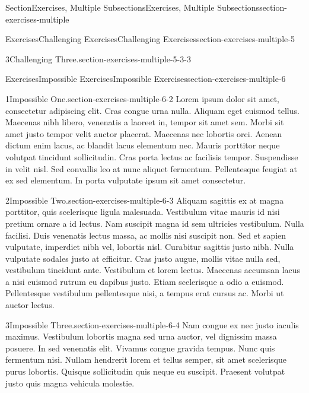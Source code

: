 \documentclass[twoside,10pt,]{article}
\numberwithin{equation}{section}
\begin{document}
\begin{sectionptx}{Section}{Exercises, Multiple Subsections}{}{Exercises, Multiple Subsections}{}{}{section-exercises-multiple}
\begin{exercises-subsection}{Exercises}{Challenging Exercises}{}{Challenging Exercises}{}{}{section-exercises-multiple-5}
\begin{exercisegroup}
\begin{divisionexerciseeg}{3}{Challenging Three.}{}{section-exercises-multiple-5-3-3}
\end{divisionexerciseeg}%
\end{exercisegroup}
\par\medskip\noindent
\end{exercises-subsection}
%
%
\typeout{************************************************}
\typeout{************************************************}
%
\begin{exercises-subsection}{Exercises}{Impossible Exercises}{}{Impossible Exercises}{}{}{section-exercises-multiple-6}
\begin{divisionexercise}{1}{Impossible One.}{}{section-exercises-multiple-6-2}%
Lorem ipsum dolor sit amet, consectetur adipiscing elit. Cras congue urna nulla. Aliquam eget euismod tellus. Maecenas nibh libero, venenatis a laoreet in, tempor sit amet sem. Morbi sit amet justo tempor velit auctor placerat. Maecenas nec lobortis orci. Aenean dictum enim lacus, ac blandit lacus elementum nec. Mauris porttitor neque volutpat tincidunt sollicitudin. Cras porta lectus ac facilisis tempor. Suspendisse in velit nisl. Sed convallis leo at nunc aliquet fermentum. Pellentesque feugiat at ex sed elementum. In porta vulputate ipsum sit amet consectetur.%
\end{divisionexercise}%
\begin{divisionexercise}{2}{Impossible Two.}{}{section-exercises-multiple-6-3}%
Aliquam sagittis ex at magna porttitor, quis scelerisque ligula malesuada. Vestibulum vitae mauris id nisi pretium ornare a id lectus. Nam suscipit magna id sem ultricies vestibulum. Nulla facilisi. Duis venenatis lectus massa, ac mollis nisi suscipit non. Sed et sapien vulputate, imperdiet nibh vel, lobortis nisl. Curabitur sagittis justo nibh. Nulla vulputate sodales justo at efficitur. Cras justo augue, mollis vitae nulla sed, vestibulum tincidunt ante. Vestibulum et lorem lectus. Maecenas accumsan lacus a nisi euismod rutrum eu dapibus justo. Etiam scelerisque a odio a euismod. Pellentesque vestibulum pellentesque nisi, a tempus erat cursus ac. Morbi ut auctor lectus.%
\end{divisionexercise}%
\begin{divisionexercise}{3}{Impossible Three.}{}{section-exercises-multiple-6-4}%
Nam congue ex nec justo iaculis maximus. Vestibulum lobortis magna sed urna auctor, vel dignissim massa posuere. In sed venenatis elit. Vivamus congue gravida tempus. Nunc quis fermentum nisi. Nullam hendrerit lorem et tellus semper, sit amet scelerisque purus lobortis. Quisque sollicitudin quis neque eu suscipit. Praesent volutpat justo quis magna vehicula molestie.%

\end{divisionexercise}
\end{exercises-subsection}
\end{sectionptx}
\end{document}
